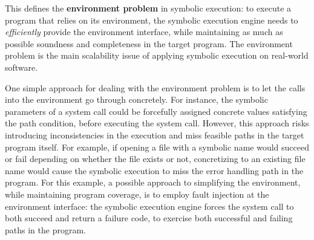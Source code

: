 \begin{framed}
  This defines the \textbf{environment problem} in symbolic execution: to execute a program that relies on its environment, the symbolic execution engine needs to \emph{efficiently} provide the environment interface, while maintaining as much as possible soundness and completeness in the target program.
  The environment problem is the main scalability issue of applying symbolic execution on real-world software.
\end{framed}

One simple approach for dealing with the environment problem is to let the calls into the environment go through concretely.
%
For instance, the symbolic parameters of a system call could be forcefully assigned concrete values satisfying the path condition, before executing the system call.  However, this approach risks introducing inconsistencies in the execution and miss feasible paths in the target program itself.
%
For example, if opening a file with a symbolic name would succeed or fail depending on whether the file exists or not, concretizing to an existing file name would cause the symbolic execution to miss the error handling path in the program.
%
For this example, a possible approach to simplifying the environment, while maintaining program coverage, is to employ fault injection at the environment interface: the symbolic execution engine forces the system call to both succeed and return a failure code, to exercise both successful and failing paths in the program.

\newcommand{\cnineccolor}{\cellcolor{GreenYellow}}
\newcommand{\chefccolor}{\cellcolor{SkyBlue}}

